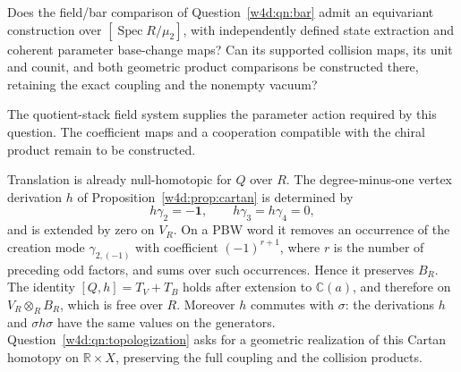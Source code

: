 \begin{question}\label{rpd:qn:geometric}
Does the field/bar comparison of Question~\ref{w4d:qn:bar} admit an
equivariant construction over $[\operatorname{Spec}R/\mu_2]$, with
independently defined state extraction and coherent parameter
base-change maps? Can its supported collision maps, its unit and
counit, and both geometric product comparisons be constructed there,
retaining the exact coupling and the nonempty vacuum?
\end{question}

The quotient-stack field system supplies the parameter action required
by this question. The coefficient maps and a cooperation compatible
with the chiral product remain to be constructed.

Translation is already null-homotopic for $Q$ over $R$.
The degree-minus-one vertex derivation $h$ of
Proposition~\ref{w4d:prop:cartan} is determined by
\[
 h\gamma_2=-\mathbf1,\qquad h\gamma_3=h\gamma_4=0,
\]
and is extended by zero on $V_R$. On a PBW word it removes an
occurrence of the creation mode $\gamma_{2,(-1)}$ with coefficient
$(-1)^{r+1}$, where $r$ is the number of preceding odd factors,
and sums over such occurrences. Hence it preserves $B_R$.
The identity $[Q,h]=T_V+T_B$ holds after extension to $\mathbb C(a)$,
and therefore on $V_R\otimes_R B_R$, which is free over $R$.
Moreover $h$ commutes with $\sigma$: the derivations $h$ and
$\sigma h\sigma$ have the same values on the generators.
Question~\ref{w4d:qn:topologization} asks for a geometric realization
of this Cartan homotopy on $\mathbb R\times X$, preserving the full
coupling and the collision products.

